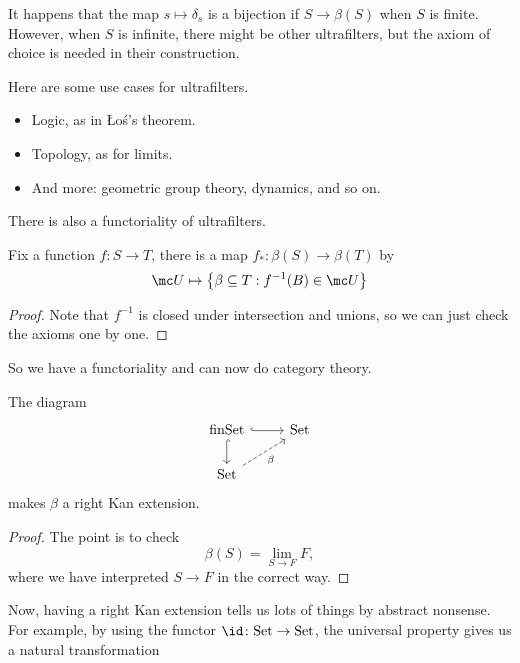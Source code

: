 \documentclass[../notes.tex]{subfiles}
\begin{document}
It happens that the map $s\mapsto\delta_s$ is a bijection if $S\to\beta(S)$ when $S$ is finite. However, when $S$ is infinite, there might be other ultrafilters, but the axiom of choice is needed in their construction.
\begin{remark}
	Here are some use cases for ultrafilters.
	\begin{itemize}
		\item Logic, as in \L{}o\'s's theorem.
		\item Topology, as for limits.
		\item And more: geometric group theory, dynamics, and so on.
	\end{itemize}
\end{remark}
There is also a functoriality of ultrafilters.
\begin{proposition}
	Fix a function $f\colon S\to T$, there is a map $f_*\colon\beta(S)\to\beta(T)$ by
	\[\mc U\mapsto\left\{\beta\subseteq T:f^{-1}(B)\in\mc U\right\}\]
\end{proposition}
\begin{proof}
	Note that $f^{-1}$ is closed under intersection and unions, so we can just check the axioms one by one.
\end{proof}
So we have a functoriality and can now do category theory.
\begin{theorem}
	The diagram
	\[\begin{tikzcd}
		{\mathrm{finSet}} & {\mathrm{Set}} \\
		{\mathrm{Set}}
		\arrow[hook, from=1-1, to=1-2]
		\arrow[hook, from=1-1, to=2-1]
		\arrow["\beta"', dashed, from=2-1, to=1-2]
	\end{tikzcd}\]
	makes $\beta$ a right Kan extension.
\end{theorem}
\begin{proof}
	The point is to check
	\[\beta(S)=\lim_{S\to F}F,\]
	where we have interpreted $S\to F$ in the correct way.
\end{proof}
Now, having a right Kan extension tells us lots of things by abstract nonsense. For example, by using the functor $\id\colon\mathrm{Set}\to\mathrm{Set}$, the universal property gives us a natural transformation
\end{document}
